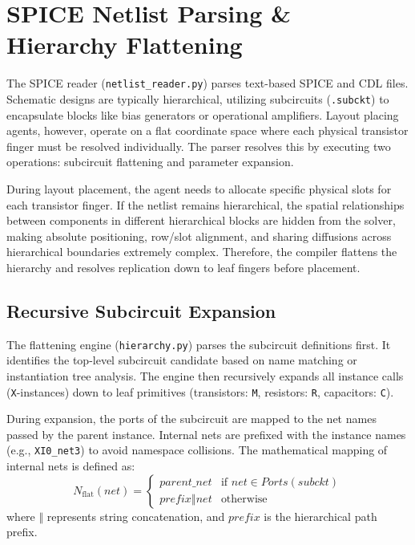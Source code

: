 \section[Netlist Parsing]{SPICE Netlist Parsing \& Hierarchy Flattening}
\label{sec:spice_flattening}

The SPICE reader (\texttt{netlist\_reader.py}) parses text-based SPICE and CDL files. Schematic designs are typically hierarchical, utilizing subcircuits (\texttt{.subckt}) to encapsulate blocks like bias generators or operational amplifiers. Layout placing agents, however, operate on a flat coordinate space where each physical transistor finger must be resolved individually. The parser resolves this by executing two operations: subcircuit flattening and parameter expansion.

During layout placement, the agent needs to allocate specific physical slots for each transistor finger. If the netlist remains hierarchical, the spatial relationships between components in different hierarchical blocks are hidden from the solver, making absolute positioning, row/slot alignment, and sharing diffusions across hierarchical boundaries extremely complex. Therefore, the compiler flattens the hierarchy and resolves replication down to leaf fingers before placement.

\subsection{Recursive Subcircuit Expansion}
The flattening engine (\texttt{hierarchy.py}) parses the subcircuit definitions first. It identifies the top-level subcircuit candidate based on name matching or instantiation tree analysis. The engine then recursively expands all instance calls (\texttt{X}-instances) down to leaf primitives (transistors: \texttt{M}, resistors: \texttt{R}, capacitors: \texttt{C}). 

During expansion, the ports of the subcircuit are mapped to the net names passed by the parent instance. Internal nets are prefixed with the instance names (e.g., \texttt{XI0\_net3}) to avoid namespace collisions. The mathematical mapping of internal nets is defined as:
\begin{equation}
    N_{\text{flat}}(net) = \begin{cases} 
      parent\_net & \text{if } net \in Ports(subckt) \\
      prefix \mathbin{\Vert} net & \text{otherwise}
   \end{cases}
\end{equation}
where $\mathbin{\Vert}$ represents string concatenation, and $prefix$ is the hierarchical path prefix.

